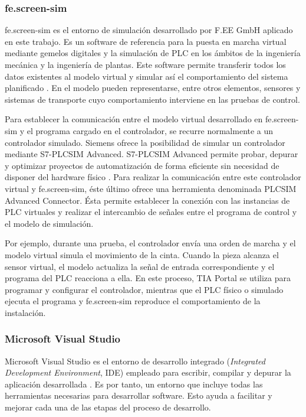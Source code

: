 \subsubsection{fe.screen-sim} \label{subsec:feescreen}

fe.screen-sim es el entorno de simulación desarrollado por F.EE GmbH aplicado en este trabajo. Es un software de referencia para la puesta en marcha virtual mediante gemelos digitales y la simulación de PLC en los ámbitos de la ingeniería mecánica y la ingeniería de plantas. Este software permite transferir todos los datos existentes al modelo virtual y simular así el comportamiento del sistema planificado . En el modelo pueden representarse, entre otros elementos, sensores y sistemas de transporte cuyo comportamiento interviene en las pruebas de control.

Para establecer la comunicación entre el modelo virtual desarrollado en fe.screen-sim y el programa cargado en el controlador, se recurre normalmente a un controlador simulado. Siemens ofrece la posibilidad de simular un controlador mediante S7-PLCSIM Advanced. S7-PLCSIM Advanced permite probar, depurar y optimizar proyectos de automatización de forma eficiente sin necesidad de disponer del hardware físico . Para realizar la comunicación entre este controlador virtual y fe.screen-sim, éste último ofrece una herramienta denominada PLCSIM Advanced Connector. Ésta permite establecer la conexión con las instancias de PLC virtuales y realizar el intercambio de señales entre el programa de control y el modelo de simulación.

Por ejemplo, durante una prueba, el controlador envía una orden de marcha y el modelo virtual simula el movimiento de la cinta. Cuando la pieza alcanza el sensor virtual, el modelo actualiza la señal de entrada correspondiente y el programa del PLC reacciona a ella. En este proceso, TIA Portal se utiliza para programar y configurar el controlador, mientras que el PLC físico o simulado ejecuta el programa y fe.screen-sim reproduce el comportamiento de la instalación.


\subsubsection{Microsoft Visual Studio} \label{subsec:microsoft_visual_studio}

Microsoft Visual Studio es el entorno de desarrollo integrado (\textit{Integrated Development Environment}, IDE) empleado para escribir, compilar y depurar la aplicación desarrollada . Es por tanto, un entorno que incluye todas las herramientas necesarias para desarrollar software. Esto ayuda a facilitar y mejorar cada una de las etapas del proceso de desarrollo.

